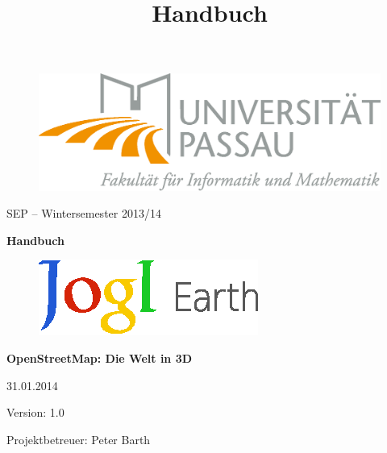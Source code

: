 \documentclass[10pt]{scrreprt}
\begin{document}
\thispagestyle{empty}
\sffamily
 
\title{Handbuch}

\begin{figure}
\begin{flushright}
	\includegraphics[scale=0.4]{uniLogo.eps}
\vspace{2.0 cm}
\end{flushright}
\end{figure}

\begin{center}
\vspace{2.0 cm}
{\LARGE SEP – Wintersemester 2013/14}

\vspace{1.0 cm}
\textbf{{\Huge Handbuch}}

\vspace{0.4 cm}
\begin{figure}[!htb]
\begin{center}
	\includegraphics[scale=1.5]{Logo-Print.eps}
\end{center}
\end{figure}

\vspace{0.2 cm}
\textbf{{\huge OpenStreetMap: Die Welt in 3D}}

\vspace{1.5 cm}
31.01.2014

\vspace{0.5 cm}
Version: 1.0

\vspace{1.5 cm}
{\Large Projektbetreuer: Peter Barth}

\end{center}


\pagebreak
\rmfamily
\tableofcontents
\end{document}
